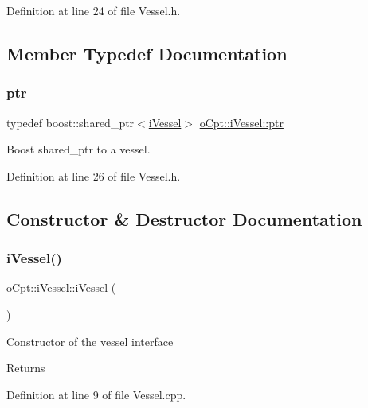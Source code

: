 Definition at line 24 of file Vessel.\+h.



\subsection{Member Typedef Documentation}
\hypertarget{classo_cpt_1_1i_vessel_a43711a596f3bdfd0ca732ed3901edc97}{}\label{classo_cpt_1_1i_vessel_a43711a596f3bdfd0ca732ed3901edc97} 
\subsubsection{\texorpdfstring{ptr}{ptr}}
{\footnotesize\ttfamily typedef boost\+::shared\+\_\+ptr$<$\hyperlink{classo_cpt_1_1i_vessel}{i\+Vessel}$>$ \hyperlink{classo_cpt_1_1i_vessel_a43711a596f3bdfd0ca732ed3901edc97}{o\+Cpt\+::i\+Vessel\+::ptr}}



Boost shared\+\_\+ptr to a vessel. 



Definition at line 26 of file Vessel.\+h.



\subsection{Constructor \& Destructor Documentation}
\hypertarget{classo_cpt_1_1i_vessel_a28f9a5ff20f10dc68261b646da3940a5}{}\label{classo_cpt_1_1i_vessel_a28f9a5ff20f10dc68261b646da3940a5} 
\subsubsection{\texorpdfstring{i\+Vessel()}{iVessel()}\hspace{0.1cm}{\footnotesize\ttfamily [1/2]}}
{\footnotesize\ttfamily o\+Cpt\+::i\+Vessel\+::i\+Vessel (\begin{DoxyParamCaption}{ }\end{DoxyParamCaption})}

Constructor of the vessel interface \begin{DoxyReturn}{Returns}

\end{DoxyReturn}


Definition at line 9 of file Vessel.\+cpp.


